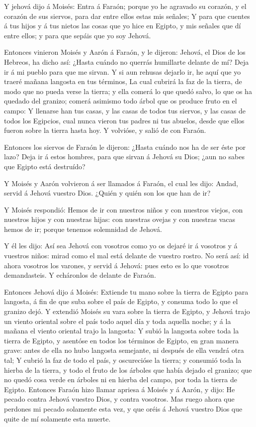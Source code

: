  Y jehová dijo á Moisés: Entra á Faraón; porque yo he
agravado su corazón, y el corazón de sus siervos, para dar entre ellos
estas mis señales;  Y para que cuentes á tus hijos y á tus
nietos las cosas que yo hice en Egipto, y mis señales que dí entre
ellos; y para que sepáis que yo soy Jehová.

 Entonces vinieron Moisés y Aarón á Faraón, y le dijeron:
Jehová, el Dios de los Hebreos, ha dicho así: ¿Hasta cuándo no querrás
humillarte delante de mí? Deja ir á mi pueblo para que me sirvan.
 Y si aun rehusas dejarlo ir, he aquí que yo traeré mañana
langosta en tus términos,  La cual cubrirá la faz de la
tierra, de modo que no pueda verse la tierra; y ella comerá lo que quedó
salvo, lo que os ha quedado del granizo; comerá asimismo todo árbol que
os produce fruto en el campo:  Y llenarse han tus casas, y
las casas de todos tus siervos, y las casas de todos los Egipcios, cual
nunca vieron tus padres ni tus abuelos, desde que ellos fueron sobre la
tierra hasta hoy. Y volvióse, y salió de con Faraón.

 Entonces los siervos de Faraón le dijeron: ¿Hasta cuándo
nos ha de ser éste por lazo? Deja ir á estos hombres, para que sirvan á
Jehová su Dios; ¿aun no sabes que Egipto está destruído?

 Y Moisés y Aarón volvieron á ser llamados á Faraón, el cual
les dijo: Andad, servid á Jehová vuestro Dios. ¿Quién y quién son los
que han de ir?

 Y Moisés respondió: Hemos de ir con nuestros niños y con
nuestros viejos, con nuestros hijos y con nuestras hijas: con nuestras
ovejas y con nuestras vacas hemos de ir; porque tenemos solemnidad de
Jehová.

 Y él les dijo: Así sea Jehová con vosotros como yo os
dejaré ir á vosotros y á vuestros niños: mirad como el mal está delante
de vuestro rostro.  No será así: id ahora vosotros los
varones, y servid á Jehová: pues esto es lo que vosotros demandasteis. Y
echáronlos de delante de Faraón.

 Entonces Jehová dijo á Moisés: Extiende tu mano sobre la
tierra de Egipto para langosta, á fin de que suba sobre el país de
Egipto, y consuma todo lo que el granizo dejó.  Y extendió
Moisés su vara sobre la tierra de Egipto, y Jehová trajo un viento
oriental sobre el país todo aquel día y toda aquella noche; y á la
mañana el viento oriental trajo la langosta:  Y subió la
langosta sobre toda la tierra de Egipto, y asentóse en todos los
términos de Egipto, en gran manera grave: antes de ella no hubo langosta
semejante, ni después de ella vendrá otra tal;  Y cubrió la
faz de todo el país, y oscurecióse la tierra; y consumió toda la hierba
de la tierra, y todo el fruto de los árboles que había dejado el
granizo; que no quedó cosa verde en árboles ni en hierba del campo, por
toda la tierra de Egipto.  Entonces Faraón hizo llamar
apriesa á Moisés y á Aarón, y dijo: He pecado contra Jehová vuestro
Dios, y contra vosotros.  Mas ruego ahora que perdones mi
pecado solamente esta vez, y que oréis á Jehová vuestro Dios que quite
de mí solamente esta muerte.

